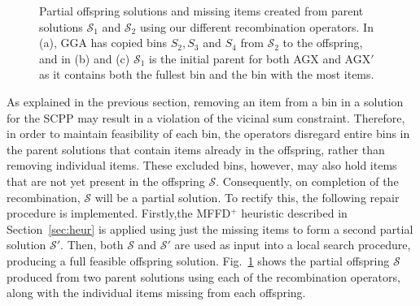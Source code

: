 \documentclass{IEEEtran}
\begin{document}
\begin{figure}[h!]	
	\centering
	\begin{minipage}{0.28\textwidth}
		
	\end{minipage} \hspace{15mm}
	\begin{minipage}{0.28\textwidth}
		
	\end{minipage}
\end{figure}

\begin{figure}[h!]	
	\centering
	\subfloat[GGA]{
		\label{fig:gga}}
	\hspace{5mm}
	\subfloat[AGX]{
		\label{fig:agx}}
	\hspace{5mm}
	\subfloat[AGX$'$]{
		\label{fig:agxdash}}
	\caption{Partial offspring solutions and missing items created from parent solutions $\mathcal{S}_1$ and $\mathcal{S}_2$ using our different recombination operators. In (a), GGA has copied bins $S_2, S_3$ and $S_4$ from $\mathcal{S}_2$ to the offspring, and in (b) and (c) $\mathcal{S}_1$ is the initial parent for both AGX and AGX$'$ as it contains both the fullest bin and the bin with the most items.}
	\label{fig:recomb}
\end{figure}

As explained in the previous section, removing an item from a bin in a solution for the SCPP may result in a violation of the vicinal sum constraint. Therefore, in order to maintain feasibility of each bin, the operators disregard entire bins in the parent solutions that contain items already in the offspring, rather than removing individual items. These excluded bins, however, may also hold items that are not yet present in the offspring $\mathcal{S}$. Consequently, on completion of the recombination, $\mathcal{S}$ will be a partial solution. To rectify this, the following repair procedure is implemented. Firstly,the MFFD$^+$ heuristic described in Section~\ref{sec:heur} is applied using just the missing items to form a second partial solution $\mathcal{S}'$. Then, both $\mathcal{S}$ and $\mathcal{S}'$ are used as input into a local search procedure, producing a full feasible offspring solution. Fig.~\ref{fig:recomb} shows the partial offspring $\mathcal{S}$ produced from two parent solutions using each of the recombination operators, along with the individual items missing from each offspring.
\end{document}
